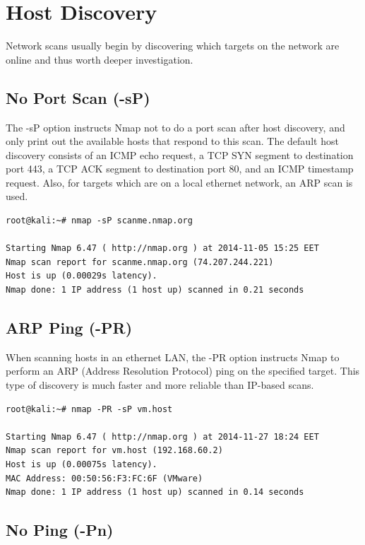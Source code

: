 \documentclass[a4paper,oneside,12pt]{book}
\begin{document}
\chapter{Host Discovery}

Network scans usually begin by discovering which targets on the network are online and thus worth deeper investigation.

\section{No Port Scan (-sP)}

The -sP option instructs Nmap not to do a port scan after host discovery, and only print out the available hosts that respond to this scan. The default host discovery consists of an ICMP echo request, a TCP SYN segment to destination port 443, a TCP ACK segment to destination port 80, and an ICMP timestamp request. Also, for targets which are on a local ethernet network, an ARP scan is used.

\begin{lstlisting}[title=A sample Nmap scan using the No Port Scan option]
root@kali:~# nmap -sP scanme.nmap.org

Starting Nmap 6.47 ( http://nmap.org ) at 2014-11-05 15:25 EET
Nmap scan report for scanme.nmap.org (74.207.244.221)
Host is up (0.00029s latency).
Nmap done: 1 IP address (1 host up) scanned in 0.21 seconds
\end{lstlisting}

\section{ARP Ping (-PR)}

When scanning hosts in an ethernet LAN, the -PR option instructs Nmap to perform an ARP (Address Resolution Protocol) ping on the specified target. This type of discovery is much faster and more reliable than IP-based scans.

\begin{lstlisting}[title=A sample Nmap scan using the ARP Ping option]
root@kali:~# nmap -PR -sP vm.host

Starting Nmap 6.47 ( http://nmap.org ) at 2014-11-27 18:24 EET
Nmap scan report for vm.host (192.168.60.2)
Host is up (0.00075s latency).
MAC Address: 00:50:56:F3:FC:6F (VMware)
Nmap done: 1 IP address (1 host up) scanned in 0.14 seconds
\end{lstlisting}

\section{No Ping (-Pn)}
\end{document}
